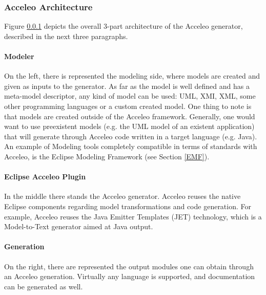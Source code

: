 \subsubsection{Acceleo Architecture}
\label{AcceleoArchitecture}
Figure \ref{AcceleoArchitecture} depicts the overall 3-part architecture of the Acceleo generator, described in the next three paragraphs.
\paragraph{Modeler}
On the left, there is represented the modeling side, where models are created and given as inputs to the generator. As far as the model is well defined and has a meta-model descriptor, any kind of model can be used: UML, XMI, XML, some other programming languages or a custom created model. One thing to note is that models are created outside of the Acceleo framework. Generally, one would want to use preexistent models (e.g. the UML model of an existent application) that will generate through Acceleo code written in a target language (e.g. Java). 
An example of Modeling tools completely compatible in terms of standards with Acceleo, is the Eclipse Modeling Framework (see Section \ref{EMF}).   
\paragraph{Eclipse Acceleo Plugin}
In the middle there stands the Acceleo generator. Acceleo reuses the native Eclipse components regarding model transformations and code generation. For example, Acceleo reuses the Java Emitter Templates (JET) technology, which is a Model-to-Text generator aimed at Java output.
\paragraph{Generation}
On the right, there are represented the output modules one can obtain through an Acceleo generation. Virtually any language is supported, and documentation can be generated as well.

